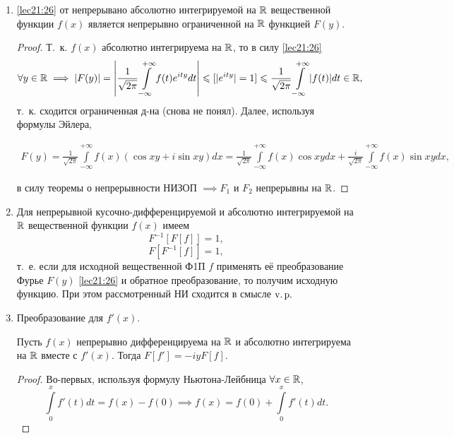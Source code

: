 \documentclass[../../main.tex]{subfiles}
\newcommand{\intii}{\int\limits_{-\infty}^{+\infty}}
\begin{document}
\begin{enumerate}
  \item \eqref{lec21:26} от непрерывано абсолютно интегрируемой на $\mathbb{R}$ 
  вещественной функции $f(x)$ является непрерывно ограниченной на $\mathbb{R}$ 
  функцией 
  $F(y)$.
  \begin{proof}
    Т.~к. $f(x)$ абсолютно интегрируема на $\mathbb{R}$, то в силу \eqref{lec21:26}
    \begin{multline*}
      \forall y \in \R \implies |F(y)| = \left|\frac{1}{\sqrt{2\pi}} \intii 
      f(t)e^{ity}dt\right| \leq [|e^{ity}| = 1] \leq \frac{1}{\sqrt{2\pi}} 
      \intii|f(t)|dt \in \R,
    \end{multline*}
    т.~к. сходится ограниченная д-на (снова не понял). Далее, используя 
    формулы Эйлера,
    
    \begin{multline*}
      F(y) = \frac{1}{\sqrt{2\pi}} \intii f(x) (\cos xy + i\sin xy)dx = 
      \frac{1}{\sqrt{2\pi}} \intii f(x) \cos xy dx + \frac{i}{\sqrt{2\pi}} 
      \intii f(x) \sin xy dx,
    \end{multline*}
    
    в силу теоремы о непрерывности НИЗОП $\implies F_1$ и $F_2$ непрерывны на 
    $\mathbb{R}$.
  \end{proof}
  
  \item Для непрерывной кусочно-дифференцируемой и абсолютно интегрируемой 
  на $\mathbb{R}$ вещественной функции $f(x)$ имеем  \[F^{-1}[F[f]] = 1,\] 
  \[F[F^{-1}[f]] = 1,\] т.~е. если для исходной вещественной Ф1П $f$ 
  применять её преобразование Фурье $F(y)$ \eqref{lec21:26} и обратное 
  преобразование, то получим исходную функцию. При этом рассмотренный НИ 
  сходится в смысле $\operatorname{v.p.}$
  
  \item Преобразование для $f'(x)$.
  
  Пусть $f(x)$ непрерывно дифференцируема на $\mathbb{R}$ и абсолютно интегрируема 
  на $\mathbb{R}$ вместе с $f'(x)$. Тогда $F[f'] = -iyF[f]$.
  
  \begin{proof}
    Во-первых, используя формулу Ньютона-Лейбница $\forall x \in \mathbb{R}$,
    \begin{equation}
      \label{lec21:28}
      \int\limits_{0}^{x}f
      '(t)dt = f(x) - f(0) \implies f(x) = f(0) + \int\limits_{0}^{x}f'(t)dt.
    \end{equation}
    

\end{proof}
\end{enumerate}
\end{document}
